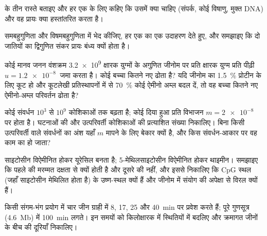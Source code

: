 \begin{exercise}[$\star$]\label{exo:b2:genome-diversification:3}
 के तीन रास्ते बताइए और हर एक के लिए कहिए कि
उसमें क्या चाहिए (संपर्क, कोई विषाणु, मुक्त DNA) और वह प्रायः क्या
हस्तांतरित करता है।
\end{exercise}

\begin{exercise}[$\star$]\label{exo:b2:genome-diversification:4}
समबहुगुणिता और विषमबहुगुणिता में भेद कीजिए, हर एक का एक उदाहरण देते
हुए, और समझाइए कि दो जातियों का द्विगुणित संकर प्रायः बंध्य क्यों होता
है।
\end{exercise}

\begin{exercise}[$\star\star$]\label{exo:b2:genome-diversification:5}
कोई मानव जनन वंशक्रम \qty{3.2e9}{} क्षारक युग्मों के अगुणित जीनोम पर
प्रति क्षारक युग्म प्रति पीढ़ी $u = \qty{1.2e-8}{}$ 
जमा करता है। कोई बच्चा कितने नए  ढोता है? यदि जीनोम का
\qty{1.5}{\%} प्रोटीन के लिए कूट हो और कूटलेखी प्रतिस्थापनों में से
\qty{70}{\%} कोई ऐमीनो अम्ल बदल दें, तो वह बच्चा कितने नए ऐमीनो-अम्ल
परिवर्तन ढोता है?
\end{exercise}

\begin{exercise}[$\star\star$]\label{exo:b2:genome-diversification:6}
कोई संवर्धन $10^{3}$ से $10^{9}$ कोशिकाओं तक बढ़ता है; कोई दिया हुआ 
प्रति विभाजन $m = \qty{2e-8}{}$ पर होता है।  घटनाओं की और
उत्परिवर्ती कोशिकाओं की प्रत्याशित संख्या निकालिए। बिना किसी
उत्परिवर्ती वाले संवर्धनों का अंश यहाँ $m$ मापने के लिए बेकार क्यों है,
और किस संवर्धन-आकार पर वह काम का हो जाता?
\end{exercise}

\begin{exercise}[$\star\star$]\label{exo:b2:genome-diversification:7}
साइटोसीन विऐमीनित होकर यूरेसिल बनता है; 5-मेथिलसाइटोसीन विऐमीनित होकर
थाइमीन। समझाइए कि पहले की मरम्मत दक्षता से क्यों होती है और दूसरे की
नहीं, और इससे निकालिए कि CpG स्थल (जहाँ साइटोसीन मेथिलित होता है)
 के उष्ण-स्थल क्यों हैं और जीनोम में संयोग की
अपेक्षा से विरल क्यों हैं।
\end{exercise}

\begin{exercise}[$\star\star$]\label{exo:b2:genome-diversification:8}
किसी संगम-भंग प्रयोग में चार जीन ग्राही में 8, 17, 25 और \qty{40}{min}
पर प्रवेश करते हैं; पूरे गुणसूत्र (\qty{4.6}{Mb}) में \qty{100}{min}
लगते। इन समयों को किलोक्षारक में स्थितियों में बदलिए और क्रमागत जीनों के
बीच की दूरियाँ निकालिए।
\end{exercise}

